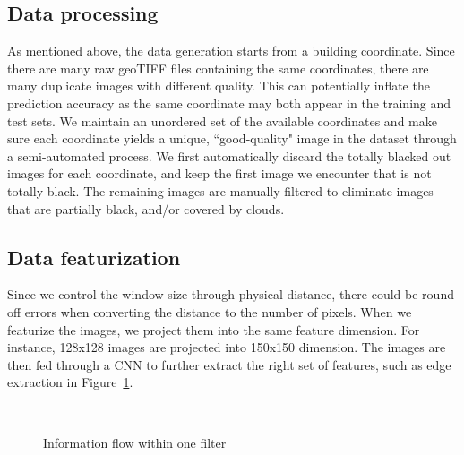 \documentclass[journal, 12pt, onecolumn,draftclsnofoot]{IEEEtran}
\begin{document}
\subsection{Data processing}\label{sec:collection}
As mentioned above, the data generation starts from a building coordinate. Since there are many raw geoTIFF files containing the same coordinates, there are many duplicate images with different quality. This can potentially inflate the prediction accuracy as the same coordinate may both appear in the training and test sets. We maintain an unordered set of the available coordinates and make sure each coordinate yields a unique, ``good-quality" image in the dataset through a semi-automated process. We first automatically discard the totally blacked out images for each coordinate, and keep the first image we encounter that is not totally black. The remaining images are manually filtered to eliminate images that are partially black, and/or covered by clouds. 



\subsection{Data featurization}\label{sec:featurization}
Since we control the window size through physical distance, there could be round off errors when converting the distance to the number of pixels. When we featurize the images, we project them into the same feature dimension. For instance, 128x128 images are projected into 150x150 dimension. The images are then fed through a CNN to further extract the right set of features, such as edge extraction in Figure~\ref{fig:one_filter}.

\begin{figure}[h]{\centering
{}
\\
\caption{\small{Information flow within one filter}}
\label{fig:one_filter}
}
\end{figure}
\end{document}
